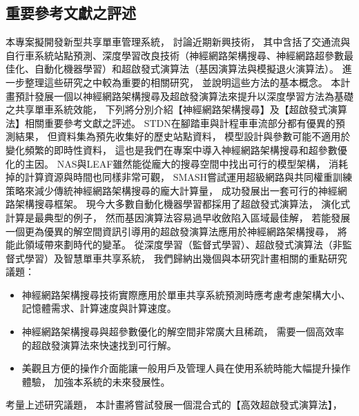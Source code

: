 \documentclass[a4paper,14pt]{extarticle}
\begin{document}
        \subsection{重要參考文獻之評述}
            本專案擬開發新型共享單車管理系統，
            討論近期新興技術，
            其中含括了交通流與自行車系統站點預測、深度學習改良技術（神經網路架構搜尋、神經網路超參數最佳化、自動化機器學習）和超啟發式演算法（基因演算法與模擬退火演算法）。
            進一步整理這些研究之中較為重要的相關研究，
            並說明這些方法的基本概念。
            本計畫預計發展一個以神經網路架構搜尋及超啟發演算法來提升以深度學習方法為基礎之共享單車系統效能，
            下列將分別介紹【神經網路架構搜尋】及【超啟發式演算法】相關重要參考文獻之評述。
            STDN\cite{yao2019revisiting}在腳踏車與計程車車流部分都有優異的預測結果，
            但資料集為預先收集好的歷史站點資料，
            模型設計與參數可能不適用於變化頻繁的即時性資料，
            這也是我們在專案中導入神經網路架構搜尋和超參數優化的主因。
            NAS\cite{zoph2016neural}與LEAF\cite{10.1145/3321707.3321721}雖然能從龐大的搜尋空間中找出可行的模型架構，
            消耗掉的計算資源與時間也同樣非常可觀，
            SMASH\cite{brock2017smash}嘗試運用超級網路與共同權重訓練策略來減少傳統神經網路架構搜尋的龐大計算量，
            成功發展出一套可行的神經網路架構搜尋框架。
            現今大多數自動化機器學習都採用了超啟發式演算法，
            演化式計算是最典型的例子，
            然而基因演算法容易過早收斂陷入區域最佳解，
            若能發展一個更為優異的解空間資訊引導用的超啟發演算法應用於神經網路架構搜尋，
            將能此領域帶來劃時代的變革。
            從深度學習（監督式學習）、超啟發式演算法（非監督式學習）及智慧單車共享系統，
            我們歸納出幾個與本研究計畫相關的重點研究議題：
            \begin{itemize}
                \item
                神經網路架構搜尋技術實際應用於單車共享系統預測時應考慮考慮架構大小、記憶體需求、計算速度與計算速度。
                \item
                神經網路架構搜尋與超參數優化的解空間非常廣大且稀疏，
                需要一個高效率的超啟發演算法來快速找到可行解。
                \item
                美觀且方便的操作介面能讓一般用戶及管理人員在使用系統時能大幅提升操作體驗，
                加強本系統的未來發展性。
            \end{itemize}
            考量上述研究議題，
            本計畫將嘗試發展一個混合式的【高效超啟發式演算法】，
\end{document}

